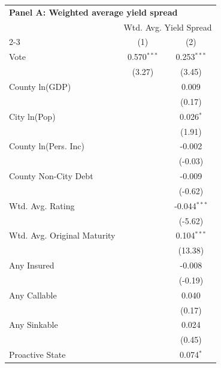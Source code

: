 \begingroup
\centering
\begin{tabular*}{\textwidth}{@{\extracolsep{\fill}}lcc}
\multicolumn{3}{l}{\textbf{Panel A: Weighted average yield spread}}\\

\addlinespace
   \toprule
    & \multicolumn{2}{c}{Wtd. Avg. Yield Spread}\\
   \cmidrule(lr){2-3}
                               & (1)           & (2)\\  
   \midrule 
   Vote                        & 0.570$^{***}$ & 0.253$^{***}$\\   
                               & (3.27)       & (3.45)\\   
   County ln(GDP)              &               & 0.009\\   
                               &               & (0.17)\\   
   City ln(Pop)                &               & 0.026$^{*}$\\   
                               &               & (1.91)\\   
   County ln(Pers. Inc)        &               & -0.002\\   
                               &               & (-0.03)\\   
   County Non-City Debt        &               & -0.009\\   
                               &               & (-0.62)\\   
   Wtd. Avg. Rating            &               & -0.044$^{***}$\\   
                               &               & (-5.62)\\   
   Wtd. Avg. Original Maturity &               & 0.104$^{***}$\\   
                               &               & (13.38)\\   
   Any Insured                 &               & -0.008\\   
                               &               & (-0.19)\\   
   Any Callable                &               & 0.040\\   
                               &               & (0.17)\\   
   Any Sinkable                &               & 0.024\\   
                               &               & (0.45)\\   
   Proactive State             &               & 0.074$^{*}$\\   

\end{tabular*}
